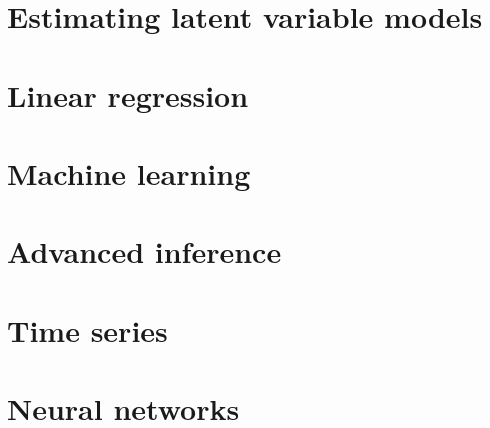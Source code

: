 \documentclass[oneside]{book}
\begin{document}
\part{Estimating latent variable models}


\part{Linear regression}









\part{Machine learning}







\part{Advanced inference}







\part{Time series}





\part{Neural networks}




\end{document}
